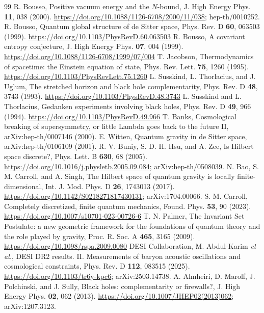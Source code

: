 \documentclass[aps,prd,twocolumn,superscriptaddress,nofootinbib]{revtex4-2}
\begin{document}
\begin{thebibliography}{99}
 R. Bousso, Positive vacuum energy and the $N$-bound, J. High Energy Phys. \textbf{11}, 038 (2000). \url{https://doi.org/10.1088/1126-6708/2000/11/038}; hep-th/0010252.
 R. Bousso, Quantum global structure of de Sitter space, Phys. Rev. D \textbf{60}, 063503 (1999). \url{https://doi.org/10.1103/PhysRevD.60.063503}
 R. Bousso, A covariant entropy conjecture, J. High Energy Phys. \textbf{07}, 004 (1999). \url{https://doi.org/10.1088/1126-6708/1999/07/004}
 T. Jacobson, Thermodynamics of spacetime: the Einstein equation of state, Phys. Rev. Lett. \textbf{75}, 1260 (1995). \url{https://doi.org/10.1103/PhysRevLett.75.1260}
 L. Susskind, L. Thorlacius, and J. Uglum, The stretched horizon and black hole complementarity, Phys. Rev. D \textbf{48}, 3743 (1993). \url{https://doi.org/10.1103/PhysRevD.48.3743}
 L. Susskind and L. Thorlacius, Gedanken experiments involving black holes, Phys. Rev. D \textbf{49}, 966 (1994). \url{https://doi.org/10.1103/PhysRevD.49.966}
 T. Banks, Cosmological breaking of supersymmetry, or little Lambda goes back to the future II, arXiv:hep-th/0007146 (2000).
 E. Witten, Quantum gravity in de Sitter space, arXiv:hep-th/0106109 (2001).
 R. V. Buniy, S. D. H. Hsu, and A. Zee, Is Hilbert space discrete?, Phys. Lett. B \textbf{630}, 68 (2005). \url{https://doi.org/10.1016/j.physletb.2005.09.084}; arXiv:hep-th/0508039.
 N. Bao, S. M. Carroll, and A. Singh, The Hilbert space of quantum gravity is locally finite-dimensional, Int. J. Mod. Phys. D \textbf{26}, 1743013 (2017). \url{https://doi.org/10.1142/S0218271817430131}; arXiv:1704.00066.
 S. M. Carroll, Completely discretized, finite quantum mechanics, Found. Phys. \textbf{53}, 90 (2023). \url{https://doi.org/10.1007/s10701-023-00726-6}
 T. N. Palmer, The Invariant Set Postulate: a new geometric framework for the foundations of quantum theory and the role played by gravity, Proc. R. Soc. A \textbf{465}, 3165 (2009). \url{https://doi.org/10.1098/rspa.2009.0080}
 DESI Collaboration, M. Abdul-Karim \emph{et al.}, DESI DR2 results. II. Measurements of baryon acoustic oscillations and cosmological constraints, Phys. Rev. D \textbf{112}, 083515 (2025). \url{https://doi.org/10.1103/tr6y-kpc6}; arXiv:2503.14738.
 A. Almheiri, D. Marolf, J. Polchinski, and J. Sully, Black holes: complementarity or firewalls?, J. High Energy Phys. \textbf{02}, 062 (2013). \url{https://doi.org/10.1007/JHEP02(2013)062}; arXiv:1207.3123.

\end{thebibliography}
\end{document}
